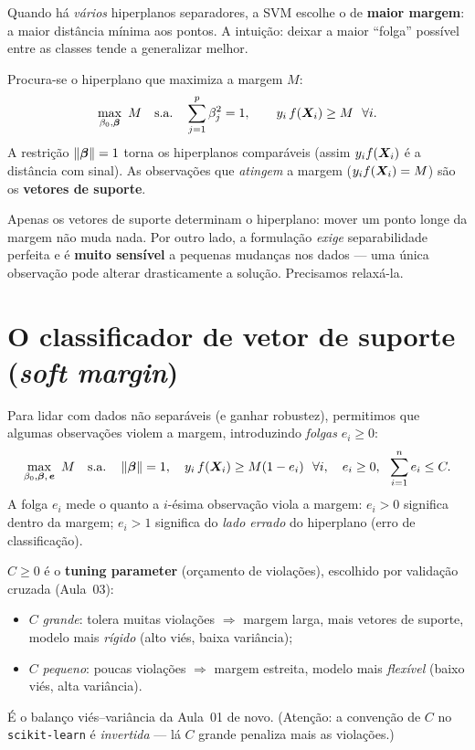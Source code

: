 \documentclass[11pt,a4paper]{article}
\begin{document}
\begin{ideia}
Quando há \emph{vários} hiperplanos separadores, a SVM escolhe o de \textbf{maior
margem}: a maior distância mínima aos pontos. A intuição: deixar a maior ``folga''
possível entre as classes tende a generalizar melhor.
\end{ideia}

\begin{definicao}
Procura-se o hiperplano que maximiza a margem $M$:
\[
  \max_{\beta_0,\bm{\beta}}\ M \quad\text{s.a.}\quad
  \sum_{j=1}^p \beta_j^2 = 1,\qquad
  y_i\,f(\bm{X}_i)\ge M \ \ \forall i.
\]
A restrição $\left\lVert \bm{\beta} \right\rVert=1$ torna os hiperplanos comparáveis (assim $y_if(\bm{X}_i)$
é a distância com sinal). As observações que \emph{atingem} a margem
($y_if(\bm{X}_i)=M$) são os \textbf{vetores de suporte}.
\end{definicao}

\begin{atencao}
Apenas os vetores de suporte determinam o hiperplano: mover um ponto longe da
margem não muda nada. Por outro lado, a formulação \emph{exige} separabilidade
perfeita e é \textbf{muito sensível} a pequenas mudanças nos dados --- uma única
observação pode alterar drasticamente a solução. Precisamos relaxá-la.
\end{atencao}

\section{O classificador de vetor de suporte (\emph{soft margin})}
Para lidar com dados não separáveis (e ganhar robustez), permitimos que algumas
observações violem a margem, introduzindo \emph{folgas} $e_i\ge 0$:
\begin{equation}\label{eq:soft}
  \max_{\beta_0,\bm{\beta},\,\bm{e}}\ M \quad\text{s.a.}\quad
  \left\lVert \bm{\beta} \right\rVert=1,\quad
  y_i\,f(\bm{X}_i)\ge M(1-e_i)\ \ \forall i,\quad
  e_i\ge 0,\ \ \sum_{i=1}^n e_i \le C.
\end{equation}
A folga $e_i$ mede o quanto a $i$-ésima observação viola a margem: $e_i>0$ significa
dentro da margem; $e_i>1$ significa do \emph{lado errado} do hiperplano (erro de
classificação).

\begin{ideia}
$C\ge 0$ é o \textbf{tuning parameter} (orçamento de violações), escolhido por
validação cruzada (Aula~03):
\begin{itemize}[leftmargin=1.2cm,nosep]
  \item $C$ \emph{grande}: tolera muitas violações $\Rightarrow$ margem larga, mais
        vetores de suporte, modelo mais \emph{rígido} (alto viés, baixa variância);
  \item $C$ \emph{pequeno}: poucas violações $\Rightarrow$ margem estreita, modelo
        mais \emph{flexível} (baixo viés, alta variância).
\end{itemize}
É o balanço viés--variância da Aula~01 de novo. (Atenção: a convenção de $C$ no
\texttt{scikit-learn} é \emph{invertida} --- lá $C$ grande penaliza mais as
violações.)
\end{ideia}
\end{document}
